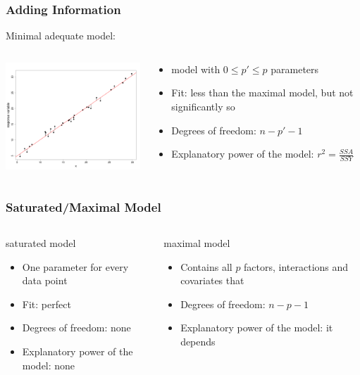 \begin{frame}\frametitle{Adding Information}
Minimal adequate model:
\begin{columns}
\begin{column}{0.6\textwidth}
\includegraphics[width=6.5cm]{img/minimalmodel2.png}
\end{column}
\begin{column}{0.4\textwidth}
\begin{itemize}
\item model with $0 \le p' \le p$ parameters
\item Fit: less than the maximal model, but not significantly so
\item Degrees of freedom: $n-p'-1$
\item Explanatory power of the model: $r^2 = \frac{SSA}{SSY}$    
\end{itemize}
\end{column}
\end{columns}
\end{frame}

\begin{frame}\frametitle{Saturated/Maximal Model}
\begin{columns}[t]
\begin{column}{0.5\textwidth}
saturated model
\begin{itemize}
\item One parameter for every data point
\item Fit: perfect
\item Degrees of freedom: none
\item Explanatory power of the model: none
\end{itemize}
\end{column}
\begin{column}{0.5\textwidth}
maximal model
\begin{itemize}
\item Contains all $p$ factors, interactions and covariates that
\item Degrees of freedom: $n-p-1$
\item Explanatory power of the model: it depends
\end{itemize}
\end{column}
\end{columns}
\end{frame}

